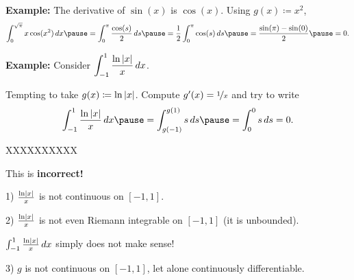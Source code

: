 \documentclass[10pt,aspectratio=169]{beamer}
\begin{document}
\begin{frame}

\textbf{Example:}
The derivative of $\sin(x)$ is $\cos(x)$.
\pause
Using $g(x) \coloneqq x^2$,
\pause
\begin{equation*}
\int_0^{\sqrt{\pi}} x \cos(x^2) \, dx
\pause
= \int_0^\pi \frac{\cos(s)}{2} \, ds
\pause
=
\frac{1}{2}
\int_0^\pi \cos(s) \, ds
\pause
=
\frac{
\sin(\pi) - \sin(0)
}{2}
\pause
=
0 .
\end{equation*}

\pause
\medskip

\textbf{Example:}
Consider
\quad
$\displaystyle
\int_{-1}^{1} \frac{\ln \left\lvert {x} \right\rvert}{x} \,dx$.

\pause
\medskip

Tempting to take $g(x) \coloneqq \ln \left\lvert {x} \right\rvert$.
\pause
Compute $g'(x) =
\nicefrac{1}{x}$ and try to write
\begin{equation*}
\int_{-1}^{1} \frac{\ln \abs{x}}{x} \,dx
\pause
=
\int_{g(-1)}^{g(1)} s \,ds
\pause
= 
\int_{0}^{0} s \,ds = 0. 
\end{equation*}
\pause
\vspace*{-42pt}
\begin{center}
{\color{red}
\Huge XXXXXXXXXX
}
\end{center}
This is \textbf{incorrect!}

\pause
\medskip

1) $\frac{\ln \left\lvert {x} \right\rvert}{x}$ is not continuous on $[-1,1]$.

\pause
\medskip

2) $\frac{\ln \left\lvert {x} \right\rvert}{x}$ is not even Riemann integrable on $[-1,1]$
(it is unbounded).

\pause
\medskip

$\int_{-1}^{1} \frac{\ln \left\lvert {x} \right\rvert}{x} \,dx$
simply does not make sense!

\pause
\medskip

3) $g$ is not continuous on $[-1,1]$, let alone continuously differentiable.

\end{frame}
\end{document}
